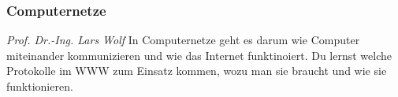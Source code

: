 
\subsubsection{Computernetze}
	\textit{Prof. Dr.-Ing. Lars Wolf}
	In Computernetze geht es darum wie Computer miteinander kommunizieren und wie das Internet funktinoiert. Du lernst welche Protokolle im WWW zum Einsatz kommen, wozu man sie braucht und wie sie funktionieren. 